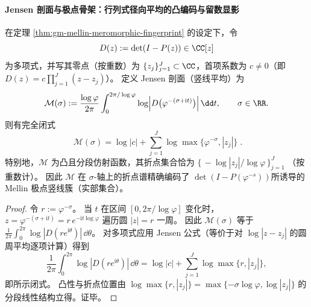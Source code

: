 \paragraph{Jensen 剖面与极点骨架：行列式径向平均的凸编码与留数显影}
\begin{proposition}\label{prop:gm-mellin-jensen-profile-det}
在定理 \ref{thm:gm-mellin-meromorphic-fingerprint} 的设定下，令
\[
D(z):=\det(I-P(z))\in\CC[z]
\]
为多项式，并写其零点（按重数）为 \(\{z_j\}_{j=1}^{J}\subset\CC\)，首项系数为 \(c\neq 0\)（即 \(D(z)=c\prod_{j=1}^{J}(z-z_j)\)）。
定义 Jensen 剖面（竖线平均）为
\[
\mathcal{M}(\sigma)
:=\frac{\log\varphi}{2\pi}\int_{0}^{2\pi/\log\varphi}
\log\Bigl|D\bigl(\varphi^{-(\sigma+\mathrm{i}t)}\bigr)\Bigr|\,\dd t,
\qquad \sigma\in\RR.
\]
则有完全闭式
\[
\boxed{\;
\mathcal{M}(\sigma)=\log|c|+\sum_{j=1}^{J}\log\max\!\bigl\{\varphi^{-\sigma},|z_j|\bigr\}\; }.
\]
特别地，\(\mathcal{M}\) 为凸且分段仿射函数，其折点集合恰为
\(
\{\,-\log|z_j|/\log\varphi\,\}_{j=1}^{J}
\)
（按重数计）。
因此 \(\mathcal{M}\) 在 \(\sigma\)-轴上的折点谱精确编码了
\(\det(I-P(\varphi^{-s}))\)所诱导的 Mellin 极点竖线簇（实部集合）。
\end{proposition}
\begin{proof}
令 \(r:=\varphi^{-\sigma}\)。
当 \(t\) 在区间 \([0,2\pi/\log\varphi]\) 变化时，
\(
z=\varphi^{-(\sigma+\mathrm{i}t)}=r\,e^{-\mathrm{i}t\log\varphi}
\)
遍历圆 \(|z|=r\) 一周。
因此 \(\mathcal{M}(\sigma)\) 等于 \(\frac{1}{2\pi}\int_{0}^{2\pi}\log|D(re^{\mathrm{i}\theta})|\,\dd\theta\)。
对多项式应用 Jensen 公式（等价于对 \(\log|z-z_j|\) 的圆周平均逐项计算）得到
\[
\frac{1}{2\pi}\int_{0}^{2\pi}\log|D(re^{\mathrm{i}\theta})|\,\dd\theta
=\log|c|+\sum_{j=1}^{J}\log\max\{r,|z_j|\},
\]
即所示闭式。
凸性与折点位置由 \(\log\max\{r,|z_j|\}=\max\{-\sigma\log\varphi,\log|z_j|\}\) 的分段线性结构立得。证毕。
\end{proof}

